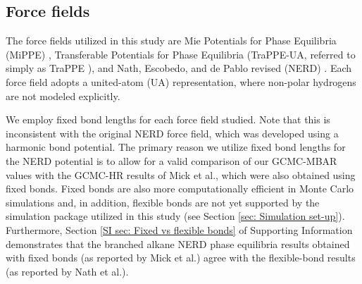 \documentclass[journal=jced,manuscript=article]{achemso}
\begin{document}
\subsection{Force fields} \label{sec: Force fields}

    The force fields utilized in this study are Mie Potentials for Phase Equilibria (MiPPE) \cite{Mie,Potoff_branched,Barhaghi2017}, Transferable Potentials for Phase Equilibria (TraPPE-UA, referred to simply as TraPPE \cite{TraPPE,Martin1999,Keasler2012}), and Nath, Escobedo, and de Pablo revised (NERD) \cite{NERD,Nath2001}. Each force field adopts a united-atom (UA) representation, where non-polar hydrogens are not modeled explicitly. 
    

    
    We employ fixed bond lengths for each force field studied. Note that this is inconsistent with the original NERD force field, which was developed using a harmonic bond potential. The primary reason we utilize fixed bond lengths for the NERD potential is to allow for a valid comparison of our GCMC-MBAR values with the GCMC-HR results of Mick et al.\cite{Potoff_branched}, which were also obtained using fixed bonds. Fixed bonds are also more computationally efficient in Monte Carlo simulations and, in addition, flexible bonds are not yet supported by the simulation package utilized in this study (see Section \ref{sec: Simulation set-up}). Furthermore, Section \ref{SI sec: Fixed vs flexible bonds} of Supporting Information demonstrates that the branched alkane NERD phase equilibria results obtained with fixed bonds (as reported by Mick et al.\cite{Potoff_branched}) agree with the flexible-bond results (as reported by Nath et al.\cite{Nath2001}).
    
    
\end{document}
